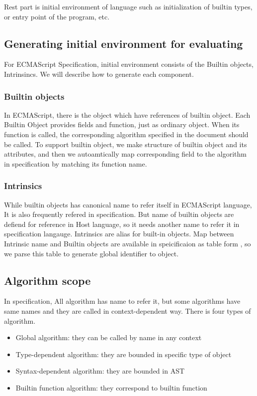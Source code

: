 Rest part is initial environment of language such as initialization of builtin types, or entry point of the program, etc.

\subsection{Generating initial environment for evaluating}
For ECMAScript Specification, initial environment consists of the Builtin objects, Intrinsincs. We will describe how to generate each component.

\subsubsection{Builtin objects}

 In ECMAScript, there is the object which have references of builtin object. Each Builtin Object provides fields and function, just as ordinary object. When its function is called,
 the corresponding algorithm specified in the document should be called. To support builtin object, we make structure of builtin object and its attributes, and then we autoamtically map corresponding field to the algorithm in specification by matching its function name.
 
 \subsubsection{Intrinsics}

 While builtin objects has canonical name to refer itself in ECMAScript language, It is also frequently refered in specification. But name of builtin objects
 are defiend for reference in Host language, so it needs another name to refer it in specification langauge. Intrinsics are alias for built-in objects. 
 Map between Intrinsic name and Builtin objects are available in speicificaion as table form , so we parse this table to generate global identifier to object.

\subsection{Algorithm scope}

 In specification, All algorithm has name to refer it, but some algorithms have same names and they are called in context-dependent way.
 There is four types of algorithm. 
 \begin{itemize}
  \item Global algorithm: they can be called by name in any context
  \item Type-dependent algorithm: they are bounded in specific type of object
  \item Syntax-dependent algorithm: they are bounded in AST
  \item Builtin function algorithm: they correspond to builtin function
  \end{itemize}


